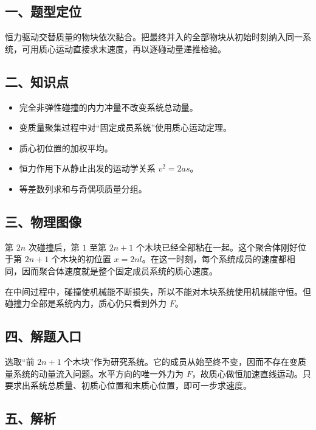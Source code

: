 \documentclass[12pt,a4paper,UTF8]{ctexart}
\newcommand{\tightlist}{\setlength{\itemsep}{0pt}\setlength{\parskip}{0pt}}
\begin{document}
\subsection{一、题型定位}\label{ux4e00ux9898ux578bux5b9aux4f4d-2}

恒力驱动交替质量的物块依次黏合。把最终并入的全部物块从初始时刻纳入同一系统，可用质心运动直接求末速度，再以逐碰动量递推检验。

\subsection{二、知识点}\label{ux4e8cux77e5ux8bc6ux70b9-2}

\begin{itemize}
\tightlist
\item
  完全非弹性碰撞的内力冲量不改变系统总动量。
\item
  变质量聚集过程中对``固定成员系统''使用质心运动定理。
\item
  质心初位置的加权平均。
\item
  恒力作用下从静止出发的运动学关系 \(v^2=2as\)。
\item
  等差数列求和与奇偶项质量分组。
\end{itemize}

\subsection{三、物理图像}\label{ux4e09ux7269ux7406ux56feux50cf-2}

第 \(2n\) 次碰撞后，第 \(1\) 至第 \(2n+1\)
个木块已经全部粘在一起。这个聚合体刚好位于第 \(2n+1\) 个木块的初位置
\(x=2nl\)。在这一时刻，每个系统成员的速度都相同，因而聚合体速度就是整个固定成员系统的质心速度。

在中间过程中，碰撞使机械能不断损失，所以不能对木块系统使用机械能守恒。但碰撞力全部是系统内力，质心仍只看到外力
\(F\)。

\subsection{四、解题入口}\label{ux56dbux89e3ux9898ux5165ux53e3-2}

选取``前 \(2n+1\)
个木块''作为研究系统。它的成员从始至终不变，因而不存在变质量系统的动量流入问题。水平方向的唯一外力为
\(F\)，故质心做恒加速直线运动。只要求出系统总质量、初质心位置和末质心位置，即可一步求速度。

\subsection{五、解析}\label{ux4e94ux89e3ux6790-2}
\end{document}
